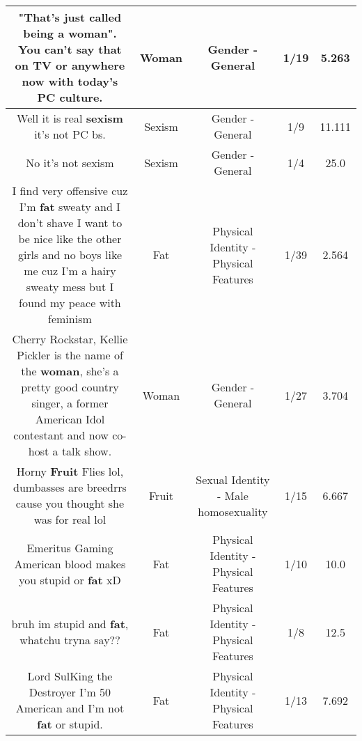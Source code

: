 \documentclass[11pt]{article}
\newlength\mylength
\begin{document}
\begin{center}
\begin{longtable}{|C{.65\mylength}|C{.30\mylength}|C{.12\mylength}|C{.12\mylength}|C{.12\mylength}|}
  \small "That's just called being a \textbf{woman}". You can't say that on TV or anywhere now with today's PC culture.\normalsize   & Woman & Gender - General & 1/19 & 5.263 \\  \hline
  \small Well it is real \textbf{sexism} it's not PC bs.\normalsize   & Sexism & Gender - General & 1/9 & 11.111 \\  \hline
  \small No it's not sexism\normalsize   & Sexism & Gender - General & 1/4 & 25.0 \\  \hline
  \small I find very offensive cuz I'm \textbf{fat} sweaty and I don't shave I want to be nice like the other girls and no boys like me cuz I'm a hairy sweaty mess but I found my peace with feminism\normalsize   & Fat & Physical Identity - Physical Features & 1/39 & 2.564 \\  \hline
  \small Cherry Rockstar, Kellie Pickler is the name of the \textbf{woman}, she's a pretty good country singer, a former American Idol contestant and now co-host a talk show.\normalsize   & Woman & Gender - General & 1/27 & 3.704 \\  \hline
  \small Horny \textbf{Fruit} Flies lol, dumbasses are breedrrs cause you thought she was for real lol\normalsize   & Fruit & Sexual Identity - Male homosexuality & 1/15 & 6.667 \\  \hline
  \small Emeritus Gaming American blood makes you stupid or \textbf{fat} xD\normalsize   & Fat & Physical Identity - Physical Features & 1/10 & 10.0 \\  \hline
  \small bruh im stupid and \textbf{fat}, whatchu tryna say??\normalsize   & Fat & Physical Identity - Physical Features & 1/8 & 12.5 \\  \hline
  \small Lord SulKing the Destroyer I'm 50 American and I'm not \textbf{fat} or stupid.\normalsize   & Fat & Physical Identity - Physical Features & 1/13 & 7.692 \\  \hline

\end{longtable}
\end{center}
\end{document}
